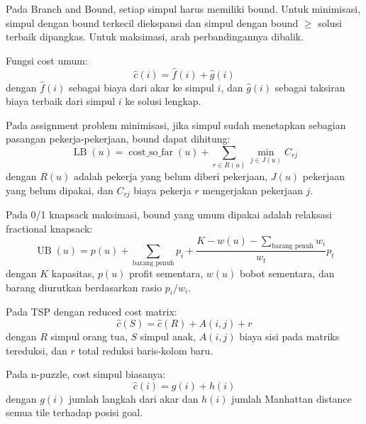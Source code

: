 \begin{jawab}
Pada Branch and Bound, setiap simpul harus memiliki bound. Untuk minimisasi, simpul dengan bound terkecil diekspansi dan simpul dengan bound $\ge$ solusi terbaik dipangkas. Untuk maksimasi, arah perbandingannya dibalik.
\end{jawab}

Fungsi cost umum:
\begin{equation}
    \hat{c}(i)=\hat{f}(i)+\hat{g}(i)
    \label{eq:bnb-general-cost-extra}
\end{equation}
dengan $\hat{f}(i)$ sebagai biaya dari akar ke simpul $i$, dan $\hat{g}(i)$ sebagai taksiran biaya terbaik dari simpul $i$ ke solusi lengkap.

Pada assignment problem minimisasi, jika simpul sudah menetapkan sebagian pasangan pekerja-pekerjaan, bound dapat dihitung:
\begin{equation}
    \operatorname{LB}(u)
    =
    \operatorname{cost\_so\_far}(u)
    +
    \sum_{r\in R(u)}
    \min_{j\in J(u)} C_{rj}
    \label{eq:assignment-lower-bound}
\end{equation}
dengan $R(u)$ adalah pekerja yang belum diberi pekerjaan, $J(u)$ pekerjaan yang belum dipakai, dan $C_{rj}$ biaya pekerja $r$ mengerjakan pekerjaan $j$.

Pada 0/1 knapsack maksimasi, bound yang umum dipakai adalah relaksasi fractional knapsack:
\begin{equation}
    \operatorname{UB}(u)
    =
    p(u)
    +
    \sum_{\text{barang penuh}} p_i
    +
    \frac{K-w(u)-\sum_{\text{barang penuh}} w_i}{w_t}p_t
    \label{eq:knapsack-upper-bound}
\end{equation}
dengan $K$ kapasitas, $p(u)$ profit sementara, $w(u)$ bobot sementara, dan barang diurutkan berdasarkan rasio $p_i/w_i$.

Pada TSP dengan reduced cost matrix:
\begin{equation}
    \hat{c}(S)=\hat{c}(R)+A(i,j)+r
    \label{eq:tsp-reduced-cost-extra}
\end{equation}
dengan $R$ simpul orang tua, $S$ simpul anak, $A(i,j)$ biaya sisi pada matriks tereduksi, dan $r$ total reduksi baris-kolom baru.

Pada n-puzzle, cost simpul biasanya:
\begin{equation}
    \hat{c}(i)=g(i)+h(i)
    \label{eq:npuzzle-cost}
\end{equation}
dengan $g(i)$ jumlah langkah dari akar dan $h(i)$ jumlah Manhattan distance semua tile terhadap posisi goal.

